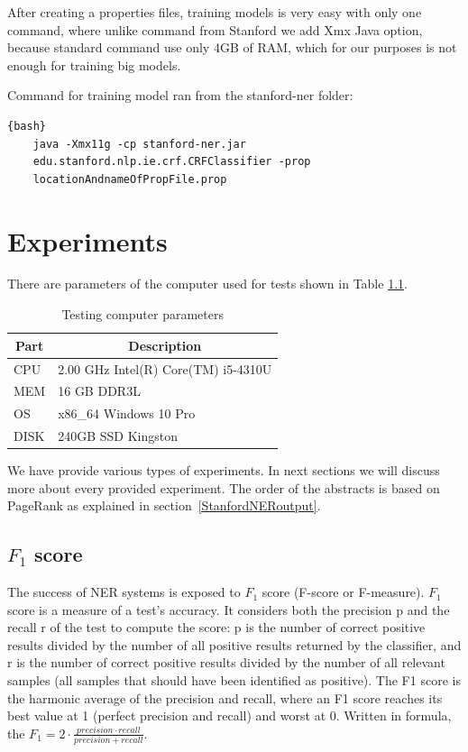 \documentclass[thesis=M,english]{FITthesis}[2018/05/30]
\begin{document}
 After creating a properties files, training models is very easy with only one command, where unlike command from Stanford we add Xmx Java option, because standard command use only 4GB of RAM, which for our purposes is not enough for training big models. 
 
 Command for training model ran from the stanford-ner folder:
 \begin{lstlisting}{bash}
 	java -Xmx11g -cp stanford-ner.jar 
 	edu.stanford.nlp.ie.crf.CRFClassifier -prop 
 	locationAndnameOfPropFile.prop
 \end{lstlisting}
\chapter{Experiments}

There are parameters of the computer used for tests shown in Table \ref{tab:PCparam}.
\begin{table}[H]\centering
	\caption{Testing computer parameters}
	\label{tab:PCparam}
	\begin{tabular}{|l|l|}
	\hline \multicolumn{1}{|c|}{\textbf{Part}} & \multicolumn{1}{|c|}{\textbf{Description}} \\\hline
	CPU & 2.00 GHz Intel(R) Core(TM) i5-4310U \\
	MEM & 16 GB DDR3L\\
	OS & x86\_64 Windows 10 Pro\\
	DISK & 240GB SSD Kingston\\\hline
	\end{tabular}
\end{table}


We have provide various types of experiments. In next sections we will discuss more about every provided experiment. The order of the abstracts is based on PageRank as explained in section~\ref{StanfordNERoutput}.

\section{$F_{1}$ score}
	The success of NER systems is exposed to $F_{1}$ score (F-score or F-measure). $F_{1}$ \cite{wiki:F1} score  is a measure of a test's accuracy. It considers both the precision p  and the recall r of the test to compute the score: p is the number of correct positive results divided by the number of all positive results returned by the classifier, and r is the number of correct positive results divided by the number of all relevant samples (all samples that should have been identified as positive). The F1 score is the harmonic average of the precision and recall, where an F1 score reaches its best value at 1 (perfect precision and recall) and worst at 0. 
Written in formula, the $F_{1} =2\cdot \frac{precision \cdot recall}{precision + recall}$.
\end{document}
